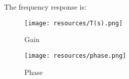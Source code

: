 \FloatBarrier

The frequency response is:

\begin{figure} [!htb] 
  \texttt{[image: resources/T(s).png]}
  \caption{Gain} 
  \label{fig:theoplots}
  \endminipage\hfill
\end{figure}

\FloatBarrier
\begin{figure} [!htb] 
  \texttt{[image: resources/phase.png]}
  \caption{Phase} 
  \label{fig:theoplots}
  \endminipage\hfill
\end{figure}

\FloatBarrier




